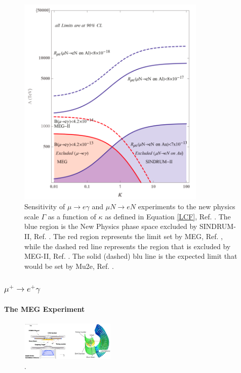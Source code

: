 \begin{figure}[!h]
\centering
\includegraphics[width =0.8\textwidth]{figures/png/Screenshot_20240313_120457.png}
\caption{Sensitivity of $\mu \rightarrow e\gamma$ and $\mu N \rightarrow eN$ experiments to the new physics
scale $\Gamma$ as a function of $\kappa$ as defined in Equation \ref{LCF}, Ref. \cite{CGroup:2022tli}. The blue region is the New
Physics phase space excluded by SINDRUM-II, Ref. \cite{SINDRUMII:2006dvw}. The red region represents the
limit set by MEG, Ref. \cite{megi}, while the dashed red line represents the region that is
excluded by MEG-II, Ref. \cite{megiicollaboration2024search}. The solid (dashed) blu line is the
expected limit that would be set by Mu2e, Ref. \cite{universe9010054}.}
\label{fig:muchannelbr}
\end{figure}
\subsubsection{$\mu^+ \rightarrow e^+ \gamma$}
\paragraph{The MEG Experiment}
\cite{megi}
\begin{figure}[!h]
\centering
\includegraphics[width =0.4\textwidth]{figures/png/Screenshot_20240307_150038.png}
\caption{.}
\label{fig:meg}
\end{figure}

